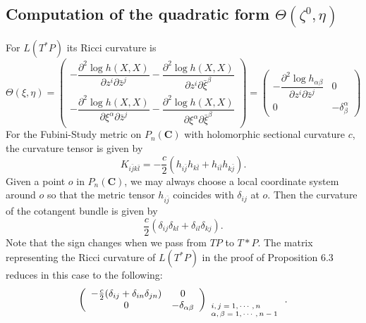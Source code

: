 \documentclass[lang=en,12pt]{beautybook}
\begin{document}
\newcommand{\tmmathbf}[1]{\ensuremath{\boldsymbol{#1}}}
\newcommand{\tmscript}[1]{\text{\scriptsize{$#1$}}}

\subsection{Computation of the quadratic form \texorpdfstring{$\Theta (\zeta^0, \eta)$}{}}
For $L (T^{\ast} P)$ its Ricci curvature is
\[ \Theta (\xi, \eta) = \left( \begin{array}{c}
     - \dfrac{\partial^2 \log h (X, X)}{\partial z^i \partial \bar{z}^j} -
     \dfrac{\partial^2 \log h (X, X)}{\partial z^i \partial
     \bar{\xi}^{\beta}}\\[1mm]
     - \dfrac{\partial^2 \log h (X, X)}{\partial \xi^{\alpha} \partial
     \bar{z}^j} - \dfrac{\partial^2 \log h (X, X)}{\partial \xi^{\alpha}
     \partial \bar{\xi}^{\beta}}
   \end{array} \right) = \left( \begin{array}{rr}
     - \dfrac{\partial^2 \log h_{\alpha \beta}}{\partial z^i \partial
     \bar{z}^j} & 0\\[1mm]
     0 & - \delta_{\beta}^{\alpha}
   \end{array} \right) \]
For the Fubini-Study metric on $P_n (\tmmathbf{C})$ with holomorphic sectional
curvature $c$, the curvature tensor is given by
\[ K_{i \bar{j} k \bar{l}} = - \frac{c}{2}  (h_{i \bar{j}} h_{k \bar{l}} +
   h_{i \bar{l}} h_{k \bar{j}}) . \]
Given a point $o$ in $P_n (\tmmathbf{C})$, we may always choose a local
coordinate system around $o$ so that the metric tensor $h_{i \bar{j}}$
coincides with $\delta_{ij}$ at $o$. Then the curvature of the cotangent
bundle is given by
\[ \frac{c}{2}  (\delta_{ij} \delta_{kl} + \delta_{il} \delta_{kj}) . \]
Note that the sign changes when we pass from $TP$ to $T \ast P$. The matrix
representing the Ricci curvature of $L (T^{\ast} P)$ in the proof of
Proposition 6.3 reduces in this case to the following:
\[ \left( \begin{array}{cc}
     - \frac{c}{2}  (\delta_{ij} + \delta_{in} \delta_{jn}) & 0\\
     0 & - \delta_{\alpha \beta}
   \end{array} \right)_{\tmscript{\begin{array}{l}
     i, j = 1, \cdots, n\\
     \alpha, \beta = 1, \cdots, n - 1
   \end{array}}} . \]
\end{document}
